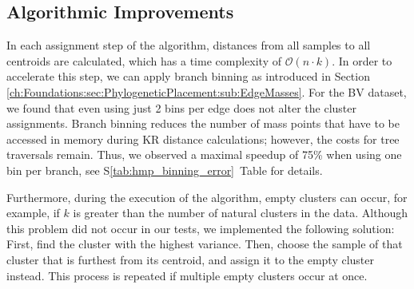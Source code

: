 
\subsection{Algorithmic Improvements}
\label{ch:Clustering:sec:PhylogeneticKmeans:sub:AlgorithmicImprovements}

In each assignment step of the algorithm, distances from all samples to all centroids are calculated,
which has a time complexity of $\mathcal{O}(n \cdot k)$.
In order to accelerate this step, we can apply branch binning as introduced in Section \ref{ch:Foundations:sec:PhylogeneticPlacement:sub:EdgeMasses}.
For the \ac{BV} dataset, we found that even using just \num{2} bins per edge does not alter the cluster assignments.
Branch binning reduces the number of mass points that have to be accessed in memory during KR distance calculations;
however, the costs for tree traversals remain.
Thus, we observed a maximal speedup of 75\% when using one bin per branch,
see S\ref{tab:hmp_binning_error}~Table for details.

Furthermore, during the execution of the algorithm, empty clusters can occur,
for example, if $k$ is greater than the number of natural clusters in the data.
Although this problem did not occur in our tests, we implemented the following solution:
First, find the cluster with the highest variance.
Then, choose the sample of that cluster that is furthest from its centroid,
and assign it to the empty cluster instead.
This process is repeated if multiple empty clusters occur at once.


